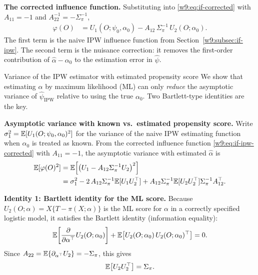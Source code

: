 \documentclass[master.tex]{subfiles}
\begin{document}
\medskip\noindent\textbf{The corrected influence function.}
Substituting into \eqref{w9:eq:if-corrected} with $A_{11}=-1$ and
$A_{22}^{-1} = -\Sigma_\pi^{-1}$,
\begin{align}
  \varphi(O)
  &=
  U_1(O;\psi_0,\alpha_0)
  - A_{12}\,\Sigma_\pi^{-1}\,U_2(O;\alpha_0).
  \label{w9:eq:if-ipw-corrected}
\end{align}
The first term is the naive IPW influence function from
Section~\ref{w9:subsec:if-ipw}.  The second term is the nuisance
correction: it removes the first-order contribution of
$\hat\alpha - \alpha_0$ to the estimation error in $\hat\psi$.

\begin{example}{Variance of the IPW estimator with estimated propensity score}
\label{w9:ex:ipw-var}
We show that estimating $\alpha$ by maximum likelihood (ML) can only
\emph{reduce} the asymptotic variance of $\hat\psi_{\mathrm{IPW}}$
relative to using the true $\alpha_0$.  Two Bartlett-type identities
are the key.

\medskip\noindent\textbf{Asymptotic variance with known vs.\ estimated
propensity score.}
Write $\sigma_1^2 = \mathbb{E}[U_1(O;\psi_0,\alpha_0)^2]$ for the variance of
the naive IPW estimating function when $\alpha_0$ is treated as known.
From the corrected influence function \eqref{w9:eq:if-ipw-corrected}
with $A_{11} = -1$, the asymptotic variance with estimated $\hat\alpha$
is
\begin{align}
  \mathbb{E}[\varphi(O)^2]
  &= \mathbb{E}\!\left[
      \bigl(U_1 - A_{12}\Sigma_\pi^{-1}U_2\bigr)^2
    \right] \notag\\
  &= \sigma_1^2
    - 2\,A_{12}\Sigma_\pi^{-1}\mathbb{E}[U_1 U_2^\top]
    + A_{12}\Sigma_\pi^{-1}\mathbb{E}[U_2 U_2^\top]\Sigma_\pi^{-1}A_{12}^\top.
  \label{w9:eq:var-decomp}
\end{align}

\medskip\noindent\textbf{Identity 1: Bartlett identity for the ML
score.}
Because $U_2(O;\alpha) = X\{T - \pi(X;\alpha)\}$ is the ML score for
$\alpha$ in a correctly specified logistic model, it satisfies the
Bartlett identity (information equality):
\[
  \mathbb{E}\!\left[\frac{\partial}{\partial\alpha^\top}U_2(O;\alpha_0)\right]
  +
  \mathbb{E}\bigl[U_2(O;\alpha_0)\,U_2(O;\alpha_0)^\top\bigr]
  = 0.
\]
Since $A_{22} = \mathbb{E}\{\partial_{\alpha^\top}U_2\} = -\Sigma_\pi$, this
gives
\begin{equation}
  \mathbb{E}\bigl[U_2 U_2^\top\bigr] = \Sigma_\pi.
  \label{w9:eq:bartlett}
\end{equation}


\end{example}
\end{document}

